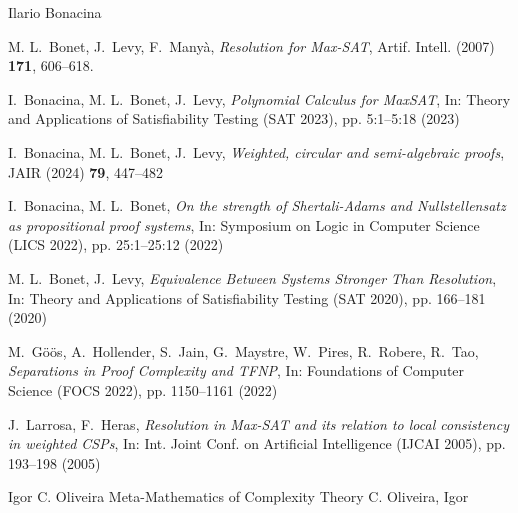 \documentclass[report]{owrart}
\begin{document}
\begin{report}
\begin{talk}{Ilario Bonacina}
  \begin{thebibliography}{99}
  
    M. L.~Bonet, J.~Levy, F.~Many{\`{a}}, \textit{Resolution for Max-{SAT}},
    Artif. Intell. (2007)
      \textbf{171}, 606--618.
      
      I.~Bonacina, M. L.~Bonet, J.~Levy, \textit{Polynomial Calculus for MaxSAT}, In: Theory and Applications of Satisfiability Testing (SAT 2023), pp. 5:1--5:18 (2023)
      
      I.~Bonacina, M. L.~Bonet, J.~Levy, \textit{Weighted, circular and semi-algebraic proofs}, JAIR (2024) \textbf{79}, 447--482
      
      I.~Bonacina, M. L.~Bonet, \textit{On the strength of Shertali-Adams and Nullstellensatz as propositional proof systems}, In: Symposium on Logic in Computer Science (LICS 2022), pp. 25:1--25:12 (2022)
      
        M. L.~Bonet, J.~Levy, \textit{Equivalence Between Systems Stronger Than Resolution}, In: Theory and Applications of Satisfiability Testing (SAT 2020), pp. 166--181 (2020)
        
        M.~G\"o\"os, A.~Hollender, S.~Jain, G.~Maystre, W.~Pires, R.~Robere, R.~Tao,
        \textit{Separations in Proof Complexity and TFNP}, In: Foundations of Computer Science (FOCS 2022), pp. 1150--1161 (2022)
        
        J.~Larrosa, F.~Heras, \textit{Resolution in Max-SAT and its relation to local consistency in weighted CSPs}, In: Int. Joint Conf. on Artificial Intelligence  (IJCAI 2005), pp. 193--198 (2005)
    
    
  
  \end{thebibliography}
  
  \end{talk}
  


\begin{talk}{Igor C. Oliveira}
    {Meta-Mathematics of Complexity Theory}
    {C. Oliveira, Igor}
    

\end{talk}
\end{report}
\end{document}
